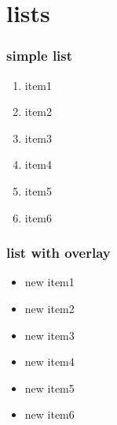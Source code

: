 \documentclass{beamer}
\begin{document}
% 
\section{lists}

\begin{frame}
  \tableofcontents
\end{frame}

% 
\begin{frame}
  \tableofcontents[currentsection]
\end{frame}

% 
\begin{frame}
\frametitle{simple list}
\begin{enumerate}
\item item1
\item item2
\item item3
\item item4
\item item5
\item item6
\end{enumerate}
\end{frame}

% 
\begin{frame}
\frametitle{list with overlay}
\begin{itemize}
\item<1-> new item1
\item<1-> new item2
\item<2-> new item3
\item<3-> new item4
\item<4-> new item5
\item<4-> new item6
\end{itemize}
\end{frame}

% 
\end{document}
